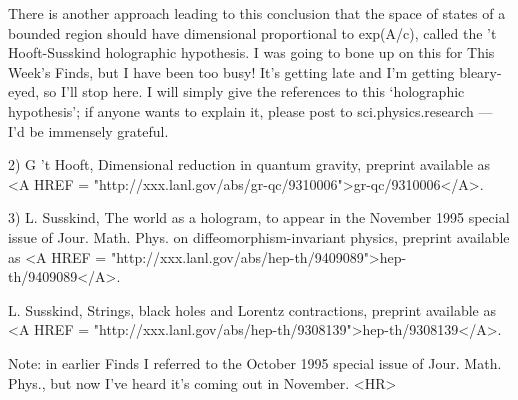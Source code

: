 There is another approach leading to this conclusion that the space
of states of a bounded region should have dimensional proportional to 
exp(A/c), called the 't Hooft-Susskind holographic hypothesis.  I was
going to bone up on this for This Week's Finds, but I have been too
busy!  It's getting late and I'm getting bleary-eyed, so I'll stop
here.  I will simply give the references to this `holographic hypothesis'; 
if anyone wants to explain it, please post to sci.physics.research --- 
I'd be immensely grateful.

2) G 't Hooft, Dimensional reduction in quantum gravity, preprint
available as <A HREF = "http://xxx.lanl.gov/abs/gr-qc/9310006">gr-qc/9310006</A>.

3) L. Susskind, The world as a hologram, to appear in the November
1995 special issue of Jour. Math. Phys. on diffeomorphism-invariant physics, 
preprint available as <A HREF = "http://xxx.lanl.gov/abs/hep-th/9409089">hep-th/9409089</A>.

L. Susskind, Strings, black holes and Lorentz contractions, preprint
available as <A HREF = "http://xxx.lanl.gov/abs/hep-th/9308139">hep-th/9308139</A>.

Note: in earlier Finds I referred to the October 1995 special issue of 
Jour. Math. Phys., but now I've heard it's coming out in November.
<HR>



